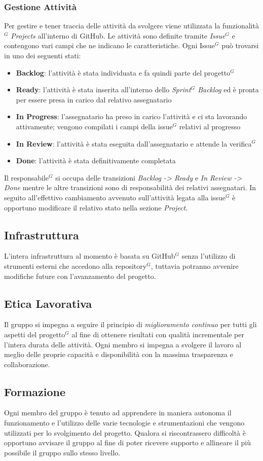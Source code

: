 \documentclass[a4paper,10pt]{article}
\begin{document}
\subsubsection{Gestione Attività}
Per gestire e tener traccia delle attività da svolgere viene utilizzata la funzionalità$^G$ \textit{Projects} all'interno di GitHub. 
Le attività sono definite tramite \textit{Issue$^G$} e contengono vari campi che ne indicano le caratteristiche.
Ogni Issue$^G$ può trovarsi in uno dei seguenti stati:
\begin{itemize}
  \item \textbf{Backlog}: l'attività è stata individuata e fa quindi parte del progetto$^G$
  \item \textbf{Ready}: l'attività è stata inserita all'interno dello \textit{Sprint$^G$ Backlog} ed è pronta per essere presa in carico dal
  relativo assegnatario 
  \item \textbf{In Progress}: l'assegnatario ha preso in carico l'attività e ci sta lavorando attivamente; vengono compilati i campi della
  issue$^G$ relativi al progresso
  \item \textbf{In Review}: l'attività è stata eseguita dall'assegnatario e attende la verifica$^G$
  \item \textbf{Done}: l'attività è stata definitivamente completata
\end{itemize}
Il responsabile$^G$ si occupa delle transizioni \textit{Backlog -> Ready} e \textit{In Review -> Done} mentre le altre transizioni sono di
responsabilità dei relativi assegnatari. In seguito all'effettivo cambiamento avvenuto sull'attività legata alla issue$^G$ è opportuno
modificare il relativo stato nella sezione \textit{Project}.
\subsection{Infrastruttura}
L'intera infrastruttura al momento è basata su GitHub$^G$ senza l'utilizzo di strumenti esterni che accedono alla repository$^G$, tuttavia
potranno avvenire modifiche future con l'avanzamento del progetto. 
\subsection{Etica Lavorativa}
Il gruppo si impegna a seguire il principio di \textit{miglioramento continuo} per tutti gli aspetti del progetto$^G$ al fine di ottenere
risultati con qualità incrementale per l'intera durata delle attività. Ogni membro si impegna a svolgere il lavoro al meglio delle proprie
capacità e disponibilità con la massima trasparenza e collaborazione.
\subsection{Formazione}
Ogni membro del gruppo è tenuto ad apprendere in maniera autonoma il funzionamento e l'utilizzo delle varie tecnologie e strumentazioni che
vengono utilizzati per lo svolgimento del progetto. Qualora si riscontrassero difficoltà è opportuno avvisare il gruppo al fine di poter
ricevere supporto e allineare il più possibile il gruppo sullo stesso livello.
\end{document}
